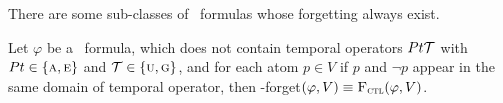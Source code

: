 \documentclass[twoside,11pt]{article}
\begin{document}
There are some sub-classes of \CTL\ formulas whose forgetting always exist.

\begin{proposition} \label{pro:fogCTL}
	Let $\varphi$ be a \CTL\ formula, which does not contain temporal operators $Pt {\cal T}$ with $Pt \in \{\textsc{a}, \textsc{e}\}$ and ${\cal T} \in \{\textsc{u}, \textsc{g}\}$, and for each atom $p\in V$ if $p$ and $\neg p$ appear in the same domain of temporal operator, then \CTL-forget$(\varphi,V) \equiv {\textsc{F}_{\textsc{ctl}}}(\varphi, V)$.
\end{proposition}

\end{document}
